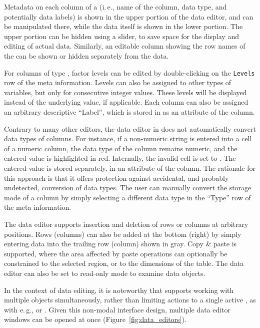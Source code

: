 Metadata on each column of a  (i.\,e., name of the column, data
type, and potentially data labels) is shown in the upper portion of
the data editor, and can be manipulated there, while the data itself is
shown in the lower portion. The upper portion can be hidden using a
slider, to save space for the display and editing of actual data.
Similarly, an editable column showing the row names of the 
can be shown or hidden separately from the data.

For columns of type , factor levels can be edited by double-clicking on the
\texttt{Levels} row of the meta information. Levels can also be assigned to other types of
variables, but only for consecutive integer values. These levels will
be displayed instead of the underlying value, if applicable. Each
column can also be assigned an arbitrary descriptive
``Label'', which is stored in
 as an attribute of the column.

Contrary to many other editors, the data editor in  does not
automatically convert data types of columns. For instance, if a
non-numeric string is entered into a cell of a numeric column, the data
type of the column remains numeric, and the entered value is
highlighted in red. Internally, the invalid cell is set to .
The entered value is stored separately, in an attribute of the column.
The rationale for this approach is that it offers protection against
accidental, and probably undetected, conversion of data types. The
user can manually convert the storage mode of a column by simply
selecting a different data type in the ``Type'' row of the meta information.

The data editor supports insertion and deletion of rows or columns at 
arbitrary positions. Rows (columns) can also be added at the bottom 
(right) by simply entering data into the trailing row (column) shown in
gray. Copy \& paste is supported, where the area affected by paste
operations can optionally be constrained to the selected region, or to
the dimensions of the table. The data editor can also be set to read-only
mode to examine data objects.

In the context of data editing, it is noteworthy that
 supports working with multiple objects simultaneously, rather than
limiting actions to a single active , as with e.\,g.,  or
. Given this non-modal interface design, multiple data editor
windows can be opened at once (Figure~\ref{fig:data_editors}).

